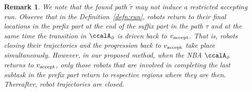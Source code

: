 \documentclass[Afour,sageh,times]{sagej}
\makeatletter
\newtheorem{cor}[thm]{Corollary}
\newtheorem{rem}[thm]{Remark}
\newcommand{\ltl}{ {\it LTL}$_{-\bigcirc}$ }
\newcommand{\autop}{\ccalA_{\phi}}
\newcommand{\vertex}[1]{v_{\textup{#1}}}
\newcommand{\scriptveryshortarrow}[1][3pt]{{%
    \hbox{\rule[\scriptratio\dimexpr\fontdimen22\textfont2-.2pt\relax]
               {\scriptratio\dimexpr#1\relax}{\scriptratio\dimexpr.4pt\relax}}%
   \mkern-4mu\hbox{\let\f@size\sf@size\usefont{U}{lasy}{m}{n}\symbol{41}}}}
\makeatother
\begin{document}
{{%

\begin{rem}
  We note that the found path $\tilde{\tau}$ may not induce a restricted accepting run. Observe that in the Definition~\ref{defn:run}, robots return to their final locations in the prefix part at the end of the suffix part in the path $\tau$ and at the same time the transition in $\autop$ is driven back to $\vertex{accept}$. That is, robots closing their trajectories and the progression back to $\vertex{accept}$ take place simultaneously.  However, in our proposed method, when the NBA $\autop$ returns to $\vertex{accept}$, only those robots that are involved in completing  the last subtask in the prefix part return to respective regions where they are then. Thereafter, robot trajectories are closed.
\end{rem}


}}
\end{document}
